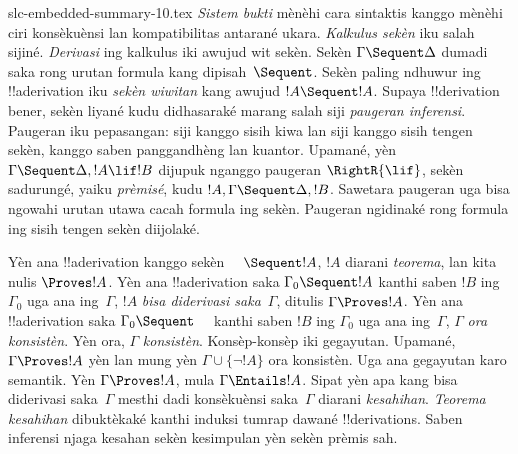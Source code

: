 \begin{filecontents*}[overwrite]{slc-embedded-summary-10.tex}
\emph{Sistem bukti} mènèhi cara sintaktis kanggo mènèhi ciri
konsèkuènsi lan kompatibilitas antarané ukara. \emph{Kalkulus
sekèn} iku salah sijiné. \emph{Derivasi} ing kalkulus iki
awujud wit sekèn. Sekèn $\Gamma\Sequent\Delta$ dumadi saka
rong urutan formula kang dipisah~$\Sequent$. Sekèn paling
ndhuwur ing !!a{derivation} iku \emph{sekèn wiwitan} kang
awujud $!A\Sequent !A$. Supaya !!{derivation} bener, sekèn
liyané kudu didhasaraké marang salah siji \emph{paugeran
inferensi}. Paugeran iku pepasangan: siji kanggo sisih kiwa lan
siji kanggo sisih tengen sekèn, kanggo saben panggandhèng lan
kuantor. Upamané, yèn $\Gamma\Sequent\Delta,!A\lif !B$ dijupuk
nganggo paugeran $\RightR{\lif}$, sekèn sadurungé, yaiku
\emph{prèmisé}, kudu $!A,\Gamma\Sequent\Delta,!B$.
Sawetara paugeran uga bisa ngowahi urutan utawa cacah formula
ing sekèn. Paugeran \RightR{\Exchange} ngidinaké rong formula
ing sisih tengen sekèn diijolaké.

Yèn ana !!a{derivation} kanggo sekèn $\quad\Sequent !A$,
$!A$ diarani \emph{teorema}, lan kita nulis $\Proves !A$.
Yèn ana !!a{derivation} saka $\Gamma_0\Sequent !A$ kanthi
saben $!B$ ing $\Gamma_0$ uga ana ing~$\Gamma$, $!A$
\emph{bisa diderivasi saka}~$\Gamma$, ditulis $\Gamma\Proves !A$.
Yèn ana !!a{derivation} saka $\Gamma_0\Sequent\quad$ kanthi
saben $!B$ ing $\Gamma_0$ uga ana ing~$\Gamma$, $\Gamma$
\emph{ora konsistèn}. Yèn ora, $\Gamma$ \emph{konsistèn}.
Konsèp-konsèp iki gegayutan. Upamané, $\Gamma\Proves !A$
yèn lan mung yèn $\Gamma\cup\{\lnot !A\}$ ora konsistèn.
Uga ana gegayutan karo semantik. Yèn $\Gamma\Proves !A$,
mula $\Gamma\Entails !A$. Sipat yèn apa kang bisa diderivasi
saka~$\Gamma$ mesthi dadi konsèkuènsi saka~$\Gamma$ diarani
\emph{kesahihan}. \emph{Teorema kesahihan} dibuktèkaké kanthi
induksi tumrap dawané !!{derivation}s. Saben inferensi njaga
kesahan sekèn kesimpulan yèn sekèn prèmis sah.
\end{filecontents*}

